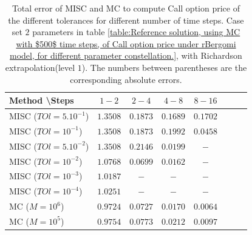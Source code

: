 \documentclass[11pt]{article}
\begin{document}
\begin{table}[h!]
	\centering
	\begin{tabular}{l*{6}{c}r}
		Method \textbackslash  Steps            & $1-2$ & $2-4$ & $4-8$ & $8-16$  \\
		\hline
		MISC ($TOl=5.10^{-1}$)  & $\mathbf{1.3508}$ & $\mathbf{  0.1873}$ & $\mathbf{
				0.1689}$ & $\mathbf{ 0.1702}$ \\
		MISC ($TOl=10^{-1}$)  & $\mathbf{1.3508}$ & $\mathbf{0.1873}$ & $\mathbf{0.1992}$ & $\mathbf{0.0458}$  \\
		MISC ($TOl=5.10^{-2}$)  & $\mathbf{1.3508}$ & $\mathbf{0.2146}$ & $\mathbf{0.0199}$ & $\mathbf{-}$  \\
		MISC ($TOl=10^{-2}$)  & $\mathbf{ 1.0768
		}$ & $\mathbf{0.0699}$ & $\mathbf{0.0162}$ & $\mathbf{-}$  \\
	MISC ($TOl=10^{-3}$)  & $\mathbf{ 1.0187}$ & $\mathbf{-}$ & $\mathbf{-}$ & $\mathbf{-}$  \\
		MISC ($TOl=10^{-4}$)  & $\mathbf{ 1.0251}$ & $\mathbf{-}$ & $\mathbf{-}$ & $\mathbf{-}$  \\
		\hline
			MC ($M=10^6$) &$\mathbf{0.9724}$  & $\mathbf{0.0727}$  & $\mathbf{0.0170}$  & $\mathbf{0.0064}$ \\	
				MC ($M=10^5$) &$\mathbf{0.9754}$  & $\mathbf{0.0773}$  & $\mathbf{0.0212}$  & $\mathbf{0.0097}$ \\
		\hline
	\end{tabular}
	\caption{Total  error of MISC and MC to compute Call option price of the different tolerances for different number of time steps. Case set $2$ parameters in table \ref{table:Reference solution, using MC with $500$ time steps, of Call option price under rBergomi model, for different parameter constellation.}, with Richardson extrapolation(level $1$). The numbers between parentheses are the corresponding absolute errors.}
	\label{Total  error of MISC and MC to compute Call option price of the different tolerances for different number of time steps. Case set $2$ parameters, with Richardson extrapolation(level $1$). The numbers between parentheses are the corresponding absolute errors.}
\end{table}
\end{document}
